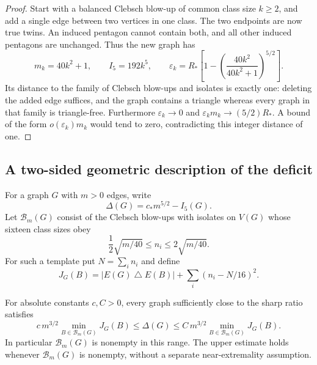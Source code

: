 \begin{proof}
Start with a balanced Clebsch blow-up of common class size $k\geq2$, and
add a single edge between two vertices in one class. The two endpoints are
now true twins. An induced pentagon cannot contain both, and all other
induced pentagons are unchanged. Thus the new graph has
\[
 m_k=40k^2+1,\qquad I_5=192k^5,\qquad
 \varepsilon_k=R_\ast\left[1-\left(\frac{40k^2}{40k^2+1}\right)^{5/2}\right].
\]
Its distance to the family of Clebsch blow-ups and isolates is exactly one:
deleting the added edge suffices, and the graph contains a triangle whereas
every graph in that family is triangle-free. Furthermore $\varepsilon_k\to0$
and $\varepsilon_km_k\to(5/2)R_\ast$. A bound of the form
$o(\varepsilon_k)m_k$ would tend to zero, contradicting this integer
distance of one.
\end{proof}

\subsection{A two-sided geometric description of the deficit}
For a graph $G$ with $m>0$ edges, write
\[
 \Delta(G)=c_\ast m^{5/2}-I_5(G).
\]
Let $\mathcal B_m(G)$ consist of the Clebsch blow-ups with isolates on
$V(G)$ whose sixteen class sizes obey
\[
 \frac12\sqrt{m/40}\leq n_i\leq2\sqrt{m/40}.
\]
For such a template put $N=\sum_i n_i$ and define
\[
 J_G(B)=|E(G)\mathbin{\triangle}E(B)|+\sum_i(n_i-N/16)^2.
\]

\begin{proposition}\label{prop:structural-energy}
For absolute constants $c,C>0$, every graph sufficiently close to the sharp
ratio satisfies
\begin{equation}\tag{49}\label{eq:49}
 c\,m^{3/2}\min_{B\in\mathcal B_m(G)}J_G(B)
 \leq\Delta(G)\leq
 C\,m^{3/2}\min_{B\in\mathcal B_m(G)}J_G(B).
\end{equation}
In particular $\mathcal B_m(G)$ is nonempty in this range. The upper
estimate holds whenever $\mathcal B_m(G)$ is nonempty, without a separate
near-extremality assumption.
\end{proposition}

